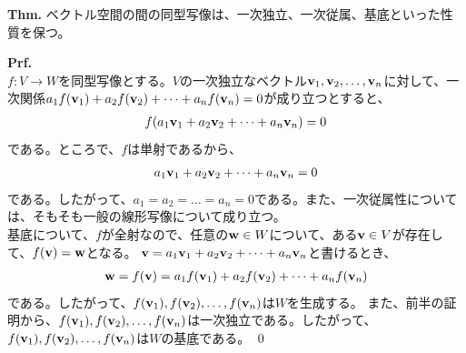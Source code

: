 \documentclass[a4paper,11pt]{jsarticle}
\numberwithin{equation}{section}
\begin{document}
\begin{itembox}[l]{\textbf{Thm.}}
  ベクトル空間の間の同型写像は、一次独立、一次従属、基底といった性質を保つ。
\end{itembox}
\textbf{Prf.}\\
$f:V \to W$を同型写像とする。$V$の一次独立なベクトル$\vb{v}_1, \vb{v}_2, \dots, \vb{v}_n$に対して、一次関係$a_1f(\vb{v}_1) + a_2f(\vb{v}_2) + \dots + a_nf(\vb{v}_n) = 0$が成り立つとすると、
\begin{align}
  f(a_1\vb{v}_1 + a_2\vb{v}_2 + \dots + a_n\vb{v}_n) = 0
\end{align}
である。ところで、$f$は単射であるから、
\begin{align}
  a_1\vb{v}_1 + a_2\vb{v}_2 + \dots + a_n\vb{v}_n = 0
\end{align}
である。したがって、$a_1 = a_2 = \dots = a_n = 0$である。また、一次従属性については、そもそも一般の線形写像について成り立つ。\\
基底について、$f$が全射なので、任意の$\vb{w} \in W$について、ある$\vb{v} \in V$が存在して、$f(\vb{v}) = \vb{w}$となる。
$\vb{v} = a_1\vb{v}_1 + a_2\vb{v}_2 + \dots + a_n\vb{v}_n$と書けるとき、
\begin{align}
  \vb{w} = f(\vb{v}) = a_1f(\vb{v}_1) + a_2f(\vb{v}_2) + \dots + a_nf(\vb{v}_n)
\end{align}
である。したがって、$f(\vb{v}_1), f(\vb{v}_2), \dots, f(\vb{v}_n)$は$W$を生成する。
また、前半の証明から、$f(\vb{v}_1), f(\vb{v}_2), \dots, f(\vb{v}_n)$は一次独立である。したがって、$f(\vb{v}_1), f(\vb{v}_2), \dots, f(\vb{v}_n)$は$W$の基底である。
\qed
\end{document}
